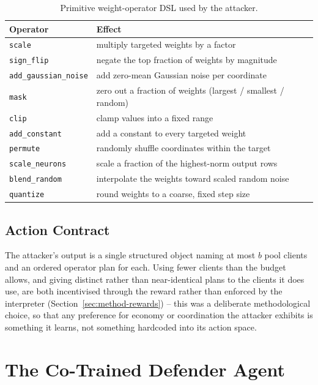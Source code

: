 \begin{table}[h]
\centering
\caption{Primitive weight-operator DSL used by the attacker.}
\label{tab:method-ops}
\begin{tabular}{|l|p{7.5cm}|}
\hline
\textbf{Operator} & \textbf{Effect} \\
\hline
\texttt{scale} & multiply targeted weights by a factor \\
\hline
\texttt{sign\_flip} & negate the top fraction of weights by magnitude \\
\hline
\texttt{add\_gaussian\_noise} & add zero-mean Gaussian noise per coordinate \\
\hline
\texttt{mask} & zero out a fraction of weights (largest / smallest / random) \\
\hline
\texttt{clip} & clamp values into a fixed range \\
\hline
\texttt{add\_constant} & add a constant to every targeted weight \\
\hline
\texttt{permute} & randomly shuffle coordinates within the target \\
\hline
\texttt{scale\_neurons} & scale a fraction of the highest-norm output rows \\
\hline
\texttt{blend\_random} & interpolate the weights toward scaled random noise \\
\hline
\texttt{quantize} & round weights to a coarse, fixed step size \\
\hline
\end{tabular}
\end{table}

\subsection{Action Contract}
The attacker's output is a single structured object naming at most $b$ pool clients and an ordered operator plan for each. Using fewer clients than the budget allows, and giving distinct rather than near-identical plans to the clients it does use, are both incentivised through the reward rather than enforced by the interpreter (Section~\ref{sec:method-rewards}) -- this was a deliberate methodological choice, so that any preference for economy or coordination the attacker exhibits is something it learns, not something hardcoded into its action space.

\section{The Co-Trained Defender Agent}
\label{sec:method-defender}

